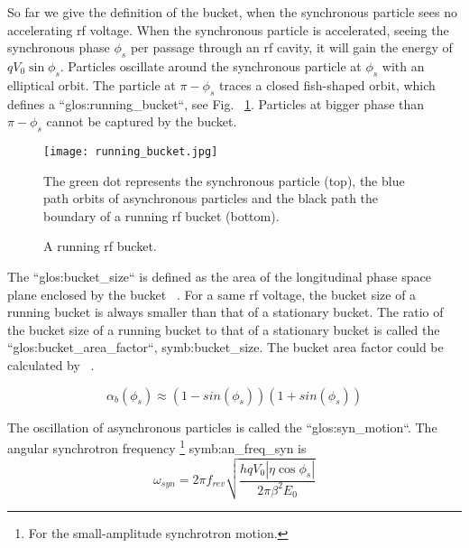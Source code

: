 So far we give the definition of the bucket, when the synchronous particle sees no accelerating rf voltage. When the synchronous particle is accelerated, seeing the synchronous phase $\phi_{\mathit{s}}$ per passage through an rf cavity, it will gain the energy of $qV_0\sin\phi_{\mathit{s}}$. %
Particles oscillate around the synchronous particle at $\phi_{\mathit{s}}$ with an elliptical orbit. The particle at $\pi-\phi_{\mathit{s}}$ traces a closed fish-shaped orbit, which defines a ``\gls{glos:running_bucket}``, see Fig. ~\ref{running_bucket}. Particles at bigger phase than $\pi-\phi_{\mathit{s}}$ cannot be captured by the bucket.
\begin{figure}[!htb]
   \centering   
   \texttt{[image: running\_bucket.jpg]}
   \caption{A running rf bucket.}{The green dot represents the synchronous particle (top), the blue path orbits of asynchronous particles and the black path the boundary of a running rf bucket (bottom).}
   \label{running_bucket}
\end{figure} 

The ``\gls{glos:bucket_size}`` is defined as the area of the longitudinal phase space plane enclosed by the bucket ~\cite{lee_accelerator_2011}. For a same rf voltage, the bucket size of a running bucket is always smaller than that of a stationary bucket. The ratio of the bucket size of a running bucket to that of a stationary bucket is called the ``\gls{glos:bucket_area_factor}``, \gls{symb:bucket_size}. The bucket area factor could be calculated by ~\cite{lee_accelerator_2011}.

\begin{equation}
\alpha_b(\phi_{s})\approx(1-sin(\phi_{s}))(1+sin(\phi_{s}))
\label{eq:buckt_area_factor}
\end{equation} 

The oscillation of asynchronous particles is called the ``\gls{glos:syn_motion}``. The angular synchrotron frequency \footnote{For the small-amplitude synchrotron motion.} \gls{symb:an_freq_syn} is ~\cite{lee_accelerator_2011}
\begin{equation}
\omega_{\mathit{syn}}=2\pi f_{\mathit{rev}}\sqrt{\frac{hqV_0|\eta\cos\phi_{s}|}{2\pi\beta^2E_0}}
\label{eq:synchfreq}
\end{equation} 

